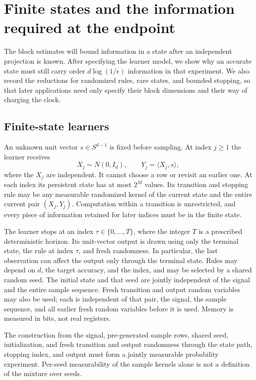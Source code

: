\section{Finite states and the information required at the endpoint}
\label{sec:model-endpoint}

The block estimates will bound information in a state after an independent
projection is known. After specifying the learner model, we show why an
accurate state must still carry order $d\log(1/\epsilon)$ information in
that experiment. We also record
the reductions for randomized rules, rare states, and bounded stopping,
so that later applications need only specify their block dimensions and
their way of charging the clock.

\subsection{Finite-state learners}

\begin{definition}\label{def:streaming-model}
An unknown unit vector $s\in S^{d-1}$ is fixed before sampling. At index
$j\ge1$ the learner receives
\[
 X_j\sim N(0,I_d),\qquad Y_j=\langle X_j,s\rangle,
\]
where the $X_j$ are independent. It cannot choose a row or revisit an earlier
one. At each index its persistent state has at most $2^M$ values. Its
transition and stopping rule may be any measurable randomized kernel of
the current state and the entire current pair $(X_j,Y_j)$. Computation
within a transition is unrestricted, and every piece of information retained
for later indices must be in the finite state.

The learner stops at an index $\tau\in\{0,\ldots,T\}$, where the integer
$T$ is a prescribed deterministic horizon. Its unit-vector output is drawn
using only the terminal state, the rule at index $\tau$, and fresh randomness.
In particular, the last observation can affect the output only through the
terminal state. Rules may depend on $d$, the target accuracy, and the index,
and may be selected by a shared random seed. The initial state and that
seed are jointly independent of the signal and the entire sample sequence.
Fresh transition and output random variables may also be used; each is
independent of that pair, the signal, the sample sequence, and all earlier
fresh random variables before it is used. Memory is measured in bits,
not real registers.

The construction from the signal, pre-generated sample rows, shared seed,
initialization, and fresh transition and output randomness through the
state path, stopping index, and output must form a jointly measurable
probability experiment. Per-seed measurability of the sample kernels alone
is not a definition of the mixture over seeds.
\end{definition}

